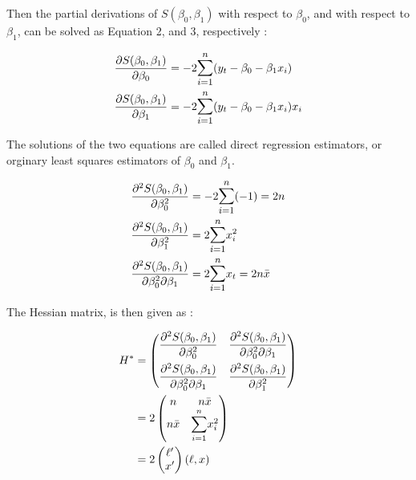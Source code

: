 \documentclass[12pt]{article}
\begin{document}
Then the partial derivations of $S(\beta_0, \beta_1)$ with respect to $\beta_0$, and with respect to $\beta_1$, can be solved as Equation 2, and 3, respectively : 

\begin{align}
	&\frac{\partial S(\beta_0, \beta_1)}{\partial \beta_0} = -2 \mathlarger{\sum^{n}_{i=1}} (y_t - \beta_0 - \beta_1 x_i) \\ 
	&\frac{\partial S(\beta_0, \beta_1)}{\partial \beta_1} = -2 \mathlarger{\sum^{n}_{i=1}} (y_t - \beta_0 - \beta_1 x_i) x_i 
\end{align}

The solutions of the two equations are called direct regression estimators, or orginary least squares estimators of $\beta_0$ and $\beta_1$. 

\begin{align*}
	\frac{\partial ^2 S(\beta_0, \beta_1)}{\partial \beta_0^2} &= -2 \mathlarger{\sum^{n}_{i=1}} (-1) = 2n \\
	\frac{\partial ^2 S(\beta_0, \beta_1)}{\partial \beta_1^2} &= 2 \mathlarger{\sum^{n}_{i=1}} x^2_i \\ 
	\frac{\partial ^2 S(\beta_0, \beta_1)}{\partial \beta_0^2 \partial \beta_1} &= 2 \mathlarger{\sum^{n}_{i=1}} x_t = 2n\bar{x} 
\end{align*}

The Hessian matrix, is then given as :

\begin{align}
	H^\ast &= \begin{pmatrix}
		\mathlarger{\frac{\partial ^2 S(\beta_0, \beta_1)}{\partial \beta_0^2}} & \mathlarger{\frac{\partial ^2 S(\beta_0, \beta_1)}{\partial \beta_0^2 \partial \beta_1}} \\[1em]
		\mathlarger{\frac{\partial ^2 S(\beta_0, \beta_1)}{\partial \beta_0^2 \partial \beta_1}} & \mathlarger{\frac{\partial ^2 S(\beta_0, \beta_1)}{\partial \beta_1^2}}
	\end{pmatrix} \\
	&= 2 \begin{pmatrix}
		n & n \bar{x} \\ 
		n \bar{x} & \mathlarger{\sum^{n}_{i=1}} x^2_i         
	\end{pmatrix} \\
	&= 2 \begin{pmatrix}
		\ell ' \\
		x'
	\end{pmatrix} (\ell, x)
\end{align}
\end{document}
